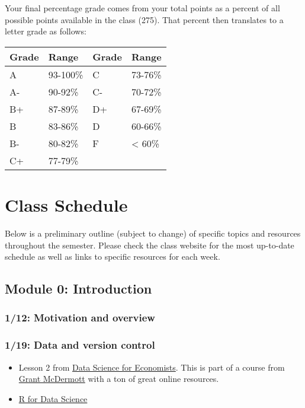 \documentclass[11pt,]{article}
\providecommand{\tightlist}{%
  \setlength{\itemsep}{0pt}\setlength{\parskip}{0pt}}
\begin{document}
Your final percentage grade comes from your total points as a percent of
all possible points available in the class (275). That percent then
translates to a letter grade as follows:

\begin{longtable}[]{@{}llll@{}}
\toprule()
Grade & Range & Grade & Range \\
\midrule()
\endhead
A & 93-100\% & C & 73-76\% \\
A- & 90-92\% & C- & 70-72\% \\
B+ & 87-89\% & D+ & 67-69\% \\
B & 83-86\% & D & 60-66\% \\
B- & 80-82\% & F & \textless{} 60\% \\
C+ & 77-79\% & & \\
\bottomrule()
\end{longtable}

\hypertarget{class-schedule}{%
\section{Class Schedule}\label{class-schedule}}

Below is a preliminary outline (subject to change) of specific topics
and resources throughout the semester. Please check the class website
for the most up-to-date schedule as well as links to specific resources
for each week.

\hypertarget{module-0-introduction}{%
\subsection{Module 0: Introduction}\label{module-0-introduction}}

\hypertarget{motivation-and-overview}{%
\subsubsection{1/12: Motivation and
overview}\label{motivation-and-overview}}

\hypertarget{data-and-version-control}{%
\subsubsection{1/19: Data and version
control}\label{data-and-version-control}}

\begin{itemize}
\tightlist
\item
  Lesson 2 from \href{https://github.com/uo-ec607/lectures}{Data Science
  for Economists}. This is part of a course from
  \href{https://grantmcdermott.com/}{Grant McDermott} with a ton of
  great online resources.
\item
  \href{https://r4ds.had.co.nz/}{R for Data Science}
\end{itemize}
\end{document}

